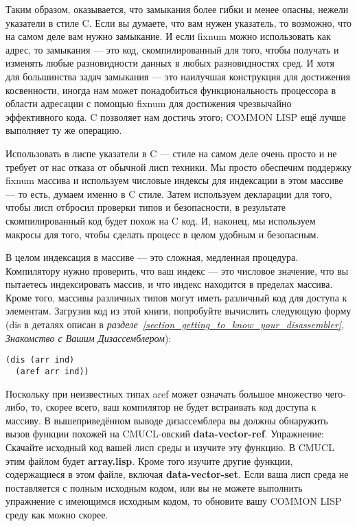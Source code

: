 Таким образом, оказывается, что замыкания более гибки и менее опасны, нежели указатели в стиле C. Если вы думаете, что вам нужен указатель, то возможно, что на самом деле вам нужно замыкание. И если fixnum можно использовать как адрес, то замыкания --- это код, скомпилированный для того, чтобы получать и изменять любые разновидности данных в любых разновидностях сред. И хотя для большинства задач замыкания --- это наилучшая конструкция для достижения косвенности, иногда нам может понадобиться функциональность процессора в области адресации с помощью fixnum для достижения чрезвычайно эффективного кода. C позволяет нам достичь этого; COMMON LISP ещё лучше выполняет ту же операцию.

Использовать в лиспе указатели в C --- стиле на самом деле очень просто и не требует от нас отказа от обычной лисп техники. Мы просто обеспечим поддержку fixnum массива и используем числовые индексы для индексации в этом массиве --- то есть, думаем именно в C стиле. Затем используем декларации для того, чтобы лисп отбросил проверки типов и безопасности, в результате скомпилированный код будет похож на C код. И, наконец, мы используем макросы для того, чтобы сделать процесс в целом удобным и безопасным.

В целом индексация в массиве --- это сложная, медленная процедура. Компилятору нужно проверить, что ваш индекс --- это числовое значение, что вы пытаетесь индексировать массив, и что индекс находится в пределах массива. Кроме того, массивы различных типов могут иметь различный код для доступа к элементам. Загрузив код из этой книги, попробуйте вычислить следующую форму (dis в деталях описан в \emph{разделе~\ref{section_getting_to_know_your_disassembler}, Знакомство с Вашим Дизассемблером}):

\begin{verbatim}
(dis (arr ind)
  (aref arr ind))
\end{verbatim}

Поскольку при неизвестных типах aref может означать большое множество чего-либо, то, скорее всего, ваш компилятор не будет встраивать код доступа к массиву. В вышеприведённом выводе дизассемблера вы должны обнаружить вызов функции похожей на CMUCL-овский \textbf{data-vector-ref}. Упражнение: Скачайте исходный код вашей лисп среды и изучите эту функцию. В CMUCL этим файлом будет \textbf{array.lisp}. Кроме того изучите другие функции, содержащиеся в этом файле, включая \textbf{data-vector-set}. Если ваша лисп среда не поставляется с полным исходным кодом, или вы не можете выполнить упражнение с имеющимся исходным кодом, то обновите вашу COMMON LISP среду как можно скорее.

